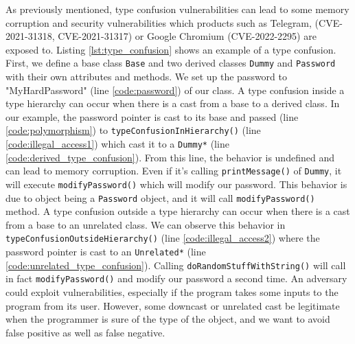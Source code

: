 \documentclass[a4paper,11pt,oneside]{report}
\begin{document}
As previously mentioned, type confusion vulnerabilities can lead to some memory
corruption and security vulnerabilities which products such as Telegram,
(CVE-2021-31318\cite{telegram_cve}, CVE-2021-31317\cite{telegram_cve_2}) 
or Google Chromium (CVE-2022-2295\cite{chromium}) are exposed to.
Listing \autoref{lst:type_confusion} shows an example of a type confusion.
First, we define a base class \texttt{Base} and two derived classes
\texttt{Dummy} and \texttt{Password} with their own attributes and methods. We
set up the password to "MyHardPassword" (line \ref{code:password}) of our
class.  A type confusion inside a type hierarchy can occur when there is a
cast from a base to a derived class.  In our example, the password pointer is
cast to its base and passed (line \ref{code:polymorphism}) to
\texttt{typeConfusionInHierarchy()} (line \ref{code:illegal_access1}) which cast
it to a \texttt{Dummy*} (line \ref{code:derived_type_confusion}).  From this
line, the behavior is undefined and can lead to memory corruption. Even if it's
calling \texttt{printMessage()} of \texttt{Dummy}, it will execute
\texttt{modifyPassword()} which will modify our password.  This behavior is due
to object being a \texttt{Password} object, and it will call
\texttt{modifyPassword()} method.  A type confusion outside a type hierarchy
can occur when there is a cast from a base to an unrelated class.  We can
observe this behavior in \texttt{typeConfusionOutsideHierarchy()} (line
\ref{code:illegal_access2})  where the password pointer is cast to an
\texttt{Unrelated*} (line \ref{code:unrelated_type_confusion}).  Calling
\texttt{doRandomStuffWithString()} will call in fact \texttt{modifyPassword()}
and modify our password a second time.  An adversary could exploit
vulnerabilities, especially if the program takes some inputs to the program
from its user.  However, some downcast or unrelated cast be legitimate when the
programmer is sure of the type of the object, and we want to avoid false
positive as well as false negative.
\end{document}
